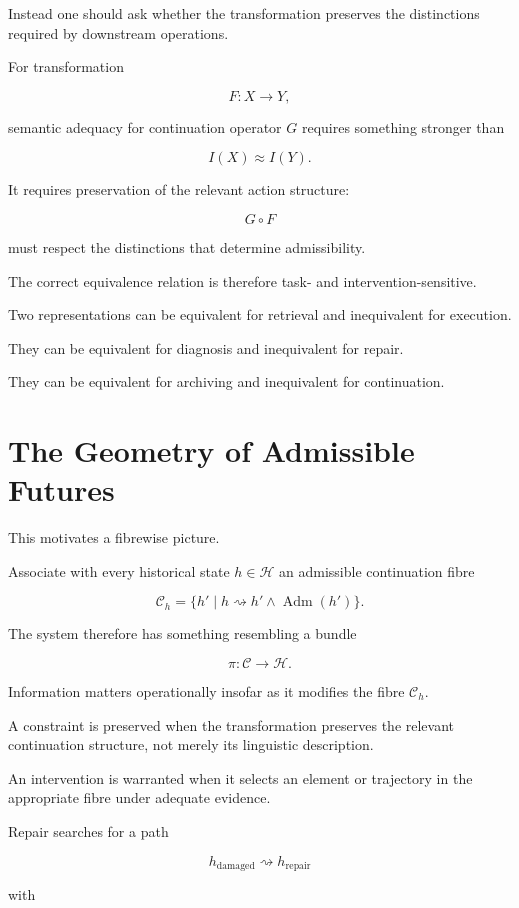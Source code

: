 \documentclass[11pt]{article}
\newcommand{\Adm}{\operatorname{Adm}}
\begin{document}
Instead one should ask whether the transformation preserves the distinctions required by downstream operations.

For transformation

\[ F:X\rightarrow Y,\]

semantic adequacy for continuation operator $G$ requires something stronger than

\[ I(X)\approx I(Y).\]

It requires preservation of the relevant action structure:

\[ G\circ F\]

must respect the distinctions that determine admissibility.

The correct equivalence relation is therefore task- and intervention-sensitive.

Two representations can be equivalent for retrieval and inequivalent for execution.

They can be equivalent for diagnosis and inequivalent for repair.

They can be equivalent for archiving and inequivalent for continuation.

\section{The Geometry of Admissible Futures}

This motivates a fibrewise picture.

Associate with every historical state $h\in\mathcal H$ an admissible continuation fibre

\[ \mathcal C_h
=
\{h'\mid h\rightsquigarrow h'\land\Adm(h')\}. \]

The system therefore has something resembling a bundle

\[ \pi:\mathcal C\rightarrow\mathcal H.\]

Information matters operationally insofar as it modifies the fibre $\mathcal C_h$.

A constraint is preserved when the transformation preserves the relevant continuation structure, not merely its linguistic description.

An intervention is warranted when it selects an element or trajectory in the appropriate fibre under adequate evidence.

Repair searches for a path

\[ h_{\mathrm{damaged}} \rightsquigarrow h_{\mathrm{repair}}\]

with
\end{document}
